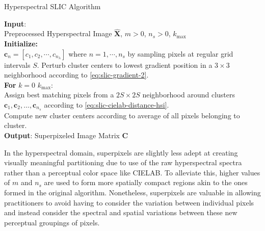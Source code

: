 \begin{algorithm}[H]
    \label{HSI SLIC}
    \caption{Hyperspectral SLIC Algorithm}
    \textbf{Input}:\\
    \quad  Preprocessed Hyperspectral Image $\hat{\mathbf{X}}$, $m > 0$, $n_s > 0$, $k_{\text{max}}$\\

    \textbf{Initialize:} \\ 
    \quad $\mathbf{c}_n = [c_1, c_2, \cdots, c_{n_\lambda}]$ where $n = 1, \cdots, n_s$ by sampling pixels at regular grid intervals $S$. Perturb cluster centers to lowest gradient position in a $3 \times 3$ neighborhood according to \eqref{eq:slic-gradient-2}. \\
    \textbf{For} $k = 0$  $k_{\text{max}}$:\\
    \quad Assign best matching pixels from a $2S \times 2S$ neighborhood around clusters $\mathbf{c}_1, \mathbf{c}_2, \dots, \mathbf{c}_{n_s}$ according to \eqref{eq:slic-cielab-distance-hsi}.\\
    \quad Compute new cluster centers according to average of all pixels belonging to cluster.
    \\
    \textbf{Output}: Superpixeled Image Matrix $\mathbf{C}$
\end{algorithm}


In the hyperspectral domain, superpixels are slightly less adept at creating visually meaningful partitioning due to use of the raw hyperspectral spectra rather than a perceptual color space like CIELAB. To alleviate this, higher values of $m$ and $n_s$ are used to form more spatially compact regions akin to the ones formed in the original algorithm. Nonetheless, superpixels are valuable in allowing practitioners to avoid having to consider the variation between individual pixels and instead consider the spectral and spatial variations between these new perceptual groupings of pixels. 